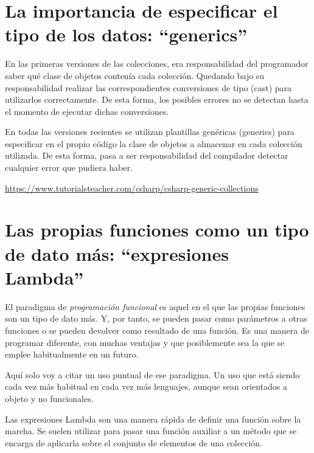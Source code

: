 \documentclass[spanish,12pt,a4paper,final,oneside]{book}
\begin{document}
\section{La importancia de especificar el tipo de los datos: “generics”}
En las primeras versiones de las colecciones, era responsabilidad del programador saber qué clase de objetos contenía cada colección. Quedando bajo su responsabilidad realizar las correspondientes conversiones  de tipo (cast) para utilizarlos correctamente. De esta forma, los posibles errores no se detectan hasta el momento de ejecutar dichas conversiones.

En todas las versiones recientes se utilizan plantillas genéricas (generics) para especificar en el propio código la clase de objetos a almacenar en cada colección utilizada. De esta forma, pasa a ser responsabilidad del compilador detectar cualquier error que pudiera haber. 

\url{https://www.tutorialsteacher.com/csharp/csharp-generic-collections}

\section{Las propias funciones como un tipo de dato más: “expresiones Lambda”}
El paradigma de \textit{programación funcional} es aquel en el que las propias funciones son un tipo de dato más. Y, por tanto, se pueden pasar como parámetros a otras funciones o se pueden devolver como resultado de una función. Es una manera de programar diferente, con muchas ventajas y que posiblemente sea la que se emplee habitualmente en un futuro.

Aquí solo voy a citar un uso puntual de ese paradigma. Un uso que está siendo cada vez más habitual en cada vez más lenguajes, aunque sean orientados a objeto y no funcionales.

Las expresiones Lambda son una manera rápida de definir una función sobre la marcha. Se suelen utilizar para pasar una función auxiliar a un método que se encarga de aplicarla sobre el conjunto de elementos de una colección.
\\
\\
\end{document}
